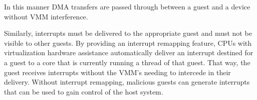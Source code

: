 In this manner DMA transfers are passed through between a guest and a device without VMM interference.

Similarly, interrupts must be delivered to the appropriate guest and must not be visible to other guests.
By providing an interrupt remapping feature, CPUs with virtualization hardware assistance automatically deliver an interrupt destined for a guest to a core that is currently running a thread of that guest.
That way, the guest receives interrupts without the VMM's needing to intercede in their delivery.
Without interrupt remapping, malicious guests can generate interrupts that can be used to gain control of the host system.

